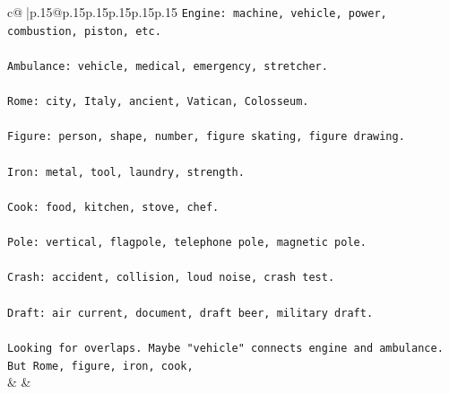 \documentclass{article}
\begin{document}
{\begin{supertabular}{c@{$\;$}|p{.15\linewidth}@{}p{.15\linewidth}p{.15\linewidth}p{.15\linewidth}p{.15\linewidth}p{.15\linewidth}}
{{{\texttt{Engine: machine, vehicle, power, combustion, piston, etc.} \\
\\ 
\texttt{Ambulance: vehicle, medical, emergency, stretcher.} \\
\\ 
\texttt{Rome: city, Italy, ancient, Vatican, Colosseum.} \\
\\ 
\texttt{Figure: person, shape, number, figure skating, figure drawing.} \\
\\ 
\texttt{Iron: metal, tool, laundry, strength.} \\
\\ 
\texttt{Cook: food, kitchen, stove, chef.} \\
\\ 
\texttt{Pole: vertical, flagpole, telephone pole, magnetic pole.} \\
\\ 
\texttt{Crash: accident, collision, loud noise, crash test.} \\
\\ 
\texttt{Draft: air current, document, draft beer, military draft.} \\
\\ 
\texttt{Looking for overlaps. Maybe "vehicle" connects engine and ambulance. But Rome, figure, iron, cook,} \\
            }
        }
    }
    & & \\ \\


\end{supertabular}}
\end{document}

